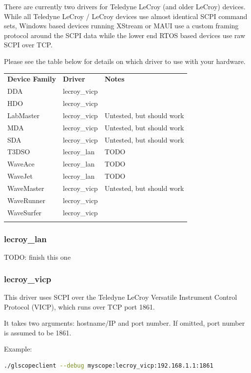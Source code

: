 \documentclass[11pt]{article}
\newcommand{\thickhline}{\Xhline{2.5\arrayrulewidth}}
\begin{document}
There are currently two drivers for Teledyne LeCroy (and older LeCroy) devices. While all Teledyne LeCroy / LeCroy
devices use almost identical SCPI command sets, Windows based devices running XStream or MAUI use a custom framing
protocol around the SCPI data while the lower end RTOS based devices use raw SCPI over TCP.

Please see the table below for details on which driver to use with  your hardware.

\begin{tabularx}{16cm}{llX}
\thickhline
\textbf{Device Family} & \textbf{Driver} & \textbf{Notes} \\
\thickhline
DDA & lecroy\_vicp & \\
\thickhline
HDO & lecroy\_vicp & \\
\thickhline
LabMaster & lecroy\_vicp & Untested, but should work\\
\thickhline
MDA & lecroy\_vicp &  Untested, but should work\\
\thickhline
SDA & lecroy\_vicp &  Untested, but should work\\
\thickhline
T3DSO & lecroy\_lan & TODO \\
\thickhline
WaveAce & lecroy\_lan & TODO \\
\thickhline
WaveJet & lecroy\_lan & TODO \\
\thickhline
WaveMaster & lecroy\_vicp & Untested, but should work \\
\thickhline
WaveRunner & lecroy\_vicp &  \\
\thickhline
WaveSurfer & lecroy\_vicp &  \\
\thickhline
\end{tabularx}

\subsubsection{lecroy\_lan}

TODO: finish this one

\subsubsection{lecroy\_vicp}

This driver uses SCPI over the Teledyne LeCroy Versatile Instrument Control Protocol (VICP), which runs over TCP port
1861.

It takes two arguments: hostname/IP and port number. If omitted, port number is assumed to be 1861.

Example:
\begin{lstlisting}[language=sh]
./glscopeclient --debug myscope:lecroy_vicp:192.168.1.1:1861
\end{lstlisting}
\end{document}
